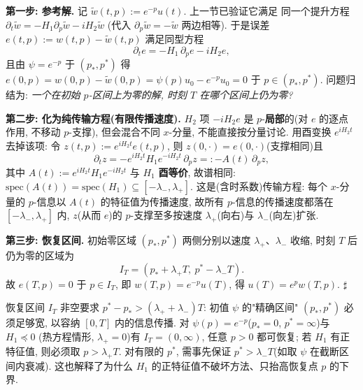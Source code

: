 \documentclass[utf8]{article} %
\numberwithin{equation}{section}   %
\newtheorem{Note}{\hskip 2em {\color{red} 注}}[subsection]
\newenvironment{Proof}{{\noindent\it Proof:}\quad}{\hfill $\sharp $\par}
\begin{document}
\begin{Proof}[三步证明]
    \textbf{第一步: 参考解.} 记 $\tilde w(t,p) := e^{-p}u(t)$. 上一节已验证它满足
    同一个提升方程 $\partial_t\tilde w = -H_1\partial_p\tilde w - iH_2\tilde w$
    (代入 $\partial_p\tilde w = -\tilde w$ 两边相等). 于是误差
    $e(t,p) := w(t,p) - \tilde w(t,p)$ 满足同型方程
    \begin{equation}
        \partial_t e = -H_1\,\partial_p e - iH_2 e,
    \end{equation}
    且由 $\psi = e^{-p}$ 于 $(p_*,p^*)$ 得
    $e(0,p) = w(0,p) - \tilde w(0,p) = \psi(p)u_0 - e^{-p}u_0 = 0$ 于 $p \in (p_*,p^*)$.
    问题归结为: \emph{一个在初始 $p$-区间上为零的解, 时刻 $T$ 在哪个区间上仍为零?}

    \textbf{第二步: 化为纯传输方程(有限传播速度).}
    $H_2$ 项 $-iH_2e$ 是 $p$-\textbf{局部}的(对 $e$ 的逐点作用, 不移动 $p$-支撑),
    但会混合不同 $x$-分量, 不能直接按分量讨论. 用酉变换 $e^{iH_2 t}$ 去掉该项:
    令 $z(t,p) := e^{iH_2 t} e(t,p)$, 则 $z(0,\cdot) = e(0,\cdot)$(支撑相同)且
    \begin{equation}
        \partial_t z = -e^{iH_2 t}H_1 e^{-iH_2 t}\,\partial_p z
        =: -A(t)\,\partial_p z,
    \end{equation}
    其中 $A(t) := e^{iH_2 t}H_1 e^{-iH_2 t}$ 与 $H_1$ \textbf{酉等价}, 故谱相同:
    $\mathrm{spec}(A(t)) = \mathrm{spec}(H_1) \subseteq [-\lambda_-, \lambda_+]$.
    这是(含时系数)传输方程: 每个 $x$-分量的 $p$-信息以 $A(t)$ 的特征值为传播速度,
    故所有 $p$-信息的传播速度都落在 $[-\lambda_-, \lambda_+]$ 内, $z$(从而 $e$)的
    $p$-支撑至多按速度 $\lambda_+$(向右)与 $\lambda_-$(向左)扩张.

    \textbf{第三步: 恢复区间.} 初始零区域 $(p_*, p^*)$ 两侧分别以速度
    $\lambda_+$、$\lambda_-$ 收缩, 时刻 $T$ 后仍为零的区域为
    \[
        I_T = (p_* + \lambda_+ T,\ p^* - \lambda_- T).
    \]
    故 $e(T,p) = 0$ 于 $p \in I_T$, 即 $w(T,p) = e^{-p}u(T)$,
    得 $u(T) = e^{p}w(T,p)$.
\end{Proof}

\begin{Note}[恢复区间的可行性]
    恢复区间 $I_T$ 非空要求 $p^* - p_* > (\lambda_+ + \lambda_-)T$:
    初值 $\psi$ 的"精确区间" $(p_*,p^*)$ 必须足够宽, 以容纳 $[0,T]$ 内的信息传播.
    对 $\psi(p) = e^{-p}$($p_* = 0$, $p^* = \infty$)与 $H_1 \preceq 0$
    (热方程情形, $\lambda_+ = 0$)有 $I_T = (0,\infty)$, 任意 $p > 0$ 都可恢复;
    若 $H_1$ 有正特征值, 则必须取 $p > \lambda_+ T$. 对有限的 $p^*$,
    需事先保证 $p^* > \lambda_- T$(如取 $\psi$ 在截断区间内衰减).
    这也解释了为什么 $H_1$ 的正特征值不破坏方法、只抬高恢复点 $p$ 的下界.
\end{Note}
\end{document}
